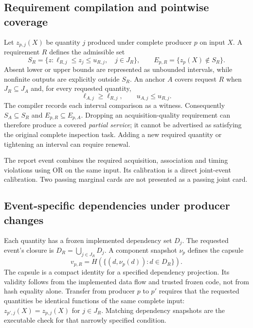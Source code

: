 \subsection{Requirement compilation and pointwise coverage}
Let $z_{p,j}(X)$ be quantity $j$ produced under complete producer $p$ on input $X$. A requirement $R$ defines the admissible set
\begin{equation}
S_R=\{z:\ell_{R,j}\le z_j\le u_{R,j},\quad j\in J_R\},\qquad
E_{p,R}=\{z_p(X)\notin S_R\}.\label{eq:r9-event}
\end{equation}
Absent lower or upper bounds are represented as unbounded intervals, while nonfinite outputs are explicitly outside $S_R$. An anchor $A$ covers request $R$ when $J_R\subseteq J_A$ and, for every requested quantity,
\begin{equation}
\ell_{A,j}\ge\ell_{R,j},\qquad u_{A,j}\le u_{R,j}.\label{eq:r9-cover}
\end{equation}
The compiler records each interval comparison as a witness. Consequently $S_A\subseteq S_R$ and $E_{p,R}\subseteq E_{p,A}$. Dropping an acquisition-quality requirement can therefore produce a covered \emph{partial service}; it cannot be advertised as satisfying the original complete inspection task. Adding a new required quantity or tightening an interval can require renewal.

The report event combines the required acquisition, association and timing violations using OR on the same input. Its calibration is a direct joint-event calibration. Two passing marginal cards are not presented as a passing joint card.

\subsection{Event-specific dependencies under producer changes}
Each quantity has a frozen implemented dependency set $D_j$. The requested event's closure is $D_R=\bigcup_{j\in J_R}D_j$. A component snapshot $\nu_p$ defines the capsule
\begin{equation}
v_{p,R}=H(\{(d,\nu_p(d)):d\in D_R\}).\label{eq:r9-capsule}
\end{equation}
The capsule is a compact identity for a specified dependency projection. Its validity follows from the implemented data flow and trusted frozen code, not from hash equality alone. Transfer from producer $p$ to $p'$ requires that the requested quantities be identical functions of the same complete input: $z_{p',j}(X)=z_{p,j}(X)$ for $j\in J_R$. Matching dependency snapshots are the executable check for that narrowly specified condition.

